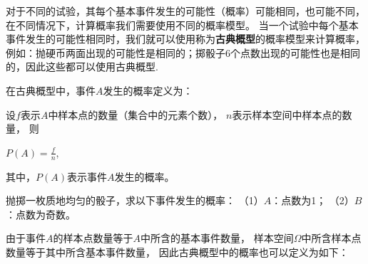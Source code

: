 对于不同的试验，其每个基本事件发生的可能性（概率）可能相同，也可能不同，在不同情况下，计算概率我们需要使用不同的概率模型。
当一个试验中每个基本事件发生的可能性相同时，我们就可以使用称为\textbf{古典概型}的概率模型来计算概率，
例如：抛硬币两面出现的可能性是相同的；掷骰子6个点数出现的可能性也是相同的，因此这些都可以使用古典概型.

在古典概型中，事件$A$发生的概率定义为：
\begin{definition}
    设$f$表示$A$中样本点的数量（集合中的元素个数），
    $n$表示样本空间中样本点的数量，
    则

    $P(A)=\frac{f}{n}$,
    
    其中，$P(A)$表示事件$A$发生的概率。
\end{definition}

\begin{example}
    抛掷一枚质地均匀的骰子，求以下事件发生的概率：
    （1）$A$：点数为1；
    （2）$B$：点数为奇数。
\end{example}

由于事件$A$的样本点数量等于$A$中所含的基本事件数量，
样本空间$\Omega$中所含样本点数量等于其中所含基本事件数量，
因此古典概型中的概率也可以定义为如下：
